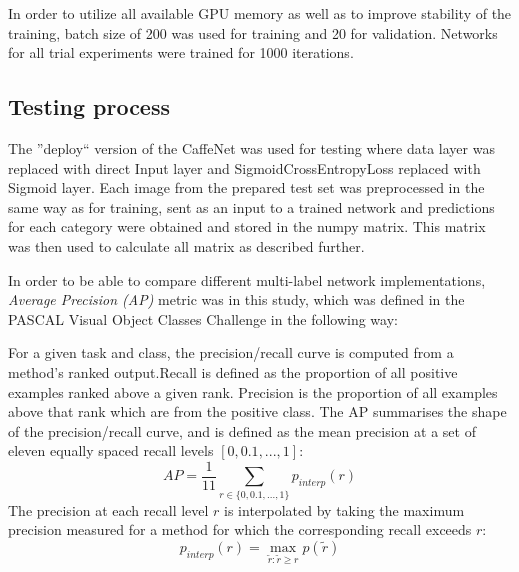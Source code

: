     In order to utilize all available GPU memory as well as to improve stability of the training, batch size of 200 was used for training and 20 for validation. Networks for all trial experiments were trained for 1000 iterations.
    
    
    
    
    \subsection{Testing process}
    The ''deploy`` version of the CaffeNet was used for testing where data layer was replaced with direct Input layer and SigmoidCrossEntropyLoss replaced with Sigmoid layer. Each image from the prepared test set was preprocessed in the same way as for training, sent as an input to a trained network and predictions for each category were obtained and stored in the numpy matrix. This matrix was then used to calculate all matrix as described further.
    
    In order to be able to compare different multi-label network implementations, \textit{Average Precision (AP)} metric was in this study, which was defined in the PASCAL Visual Object Classes Challenge \cite{Everingham2010PASCAL-VOC} in the following way:
    
    \begin{displayquote}
    For a given task and class, the precision/recall curve is computed from a method’s ranked output.Recall is defined as the proportion of all positive examples ranked above a given rank. Precision is the proportion of all examples above that rank which are from the positive class. The AP summarises the shape of the precision/recall curve, and is defined as the mean precision at a set of eleven equally spaced recall levels $[0,0.1, . . . ,1]$:
    $$
    AP = \frac{1}{11} \sum_{r \in \{0, 0.1, ..., 1\}} p_{interp}(r)
    $$
    The precision at each recall level $r$ is interpolated by taking the maximum precision measured for a method for which the corresponding recall exceeds $r$:
    $$
    p_{interp}(r) = \max_{\tilde{r}:\tilde{r} \ge r} p(\tilde{r})
    $$
    \end{displayquote}
    
